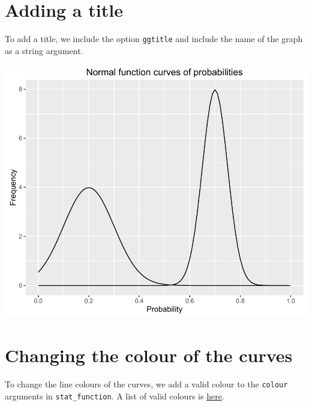 \section{Adding a title}\label{adding-a-title}

To add a title, we include the option \texttt{ggtitle} and include the
name of the graph as a string argument.

\begin{Shaded}
\begin{Highlighting}[]
\StringTok{ }\StringTok{ }\NormalTok{(}\NormalTok{)}
\end{Highlighting}
\end{Shaded}

\begin{center}\includegraphics[width=0.6\linewidth]{9_Function_Plots_pdf/function_7-1} \end{center}

\section{Changing the colour of the
curves}\label{changing-the-colour-of-the-curves}

To change the line colours of the curves, we add a valid colour to the
\texttt{colour} arguments in \texttt{stat\_function}. A list of valid
colours is
\href{http://www.stat.columbia.edu/~tzheng/files/Rcolor.pdf}{here}.

